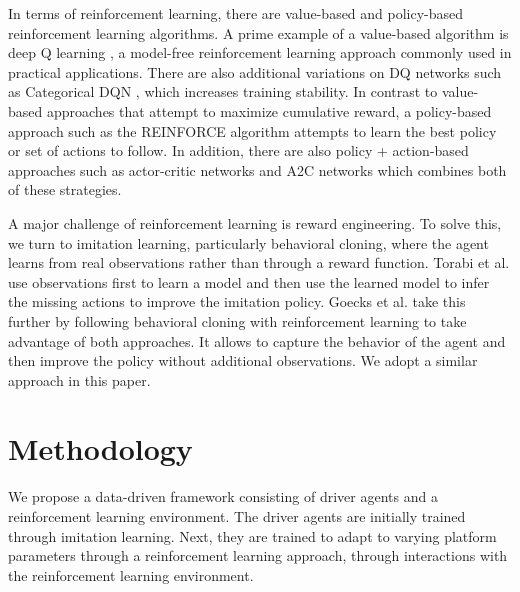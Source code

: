 \documentclass[runningheads]{llncs}
\begin{document}
In terms of reinforcement learning, there are value-based and policy-based reinforcement learning algorithms. A prime example of a value-based algorithm is deep Q learning \cite{Mnih2015}, a model-free reinforcement learning approach commonly used in practical applications. There are also additional variations on DQ networks such as Categorical DQN \cite{bellemare2017}, which increases training stability. In contrast to value-based approaches that attempt to maximize cumulative reward, a policy-based approach such as the REINFORCE algorithm \cite{sutton1999} attempts to learn the best policy or set of actions to follow. In addition, there are also policy + action-based approaches such as actor-critic networks \cite{konda2000} and A2C networks \cite{mnih2016} which combines both of these strategies.

A major challenge of reinforcement learning is reward engineering. To solve this, we turn to imitation learning, particularly behavioral cloning, where the agent learns from real observations rather than through a reward function. Torabi et al. \cite{IJCAI2018-torabi} use observations first to learn a model and then use the learned model to infer the missing actions to improve the imitation policy. Goecks et al. \cite{goecks2020integrating} take this further by following behavioral cloning with reinforcement learning to take advantage of both approaches. It allows to capture the behavior of the agent and then improve the policy without additional observations. We adopt a similar approach in this paper.


\section{Methodology}

We propose a data-driven framework consisting of driver agents and a reinforcement learning environment. The driver agents are initially trained through imitation learning. Next, they are trained to adapt to varying platform parameters through a reinforcement learning approach, through interactions with the reinforcement learning environment. 
\end{document}
